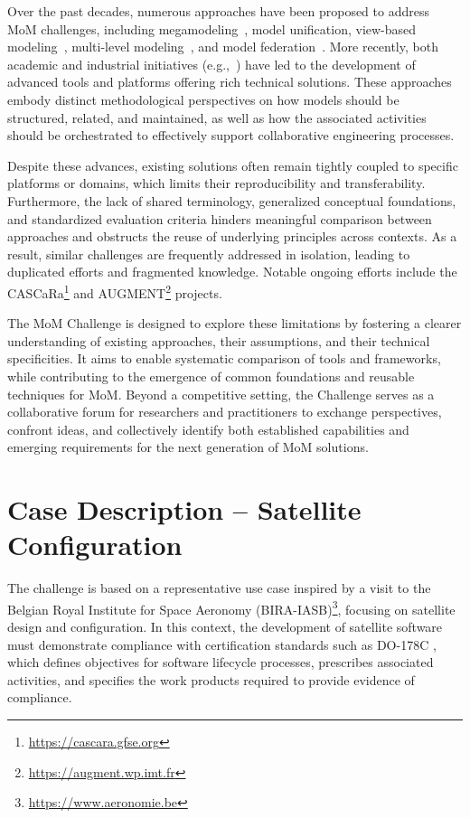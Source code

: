 \documentclass{article}
\begin{document}
Over the past decades, numerous approaches have been proposed to address MoM
challenges, including megamodeling~\cite{bezivin2004need}, model unification,
view-based modeling~\cite{osate-dim}, multi-level modeling~\cite{megamodel}, and
model federation~\cite{openflexo}. More recently, both academic and
industrial initiatives (e.g.,~\cite{renault-mom,magicgrid,openmbee,opencaesar,magicdraw})
have led to the development of advanced tools and platforms offering rich
technical solutions. These approaches embody distinct methodological perspectives
on how models should be structured, related, and maintained, as well as how the
associated activities should be orchestrated to effectively support collaborative
engineering processes.

Despite these advances, existing solutions often remain tightly coupled to
specific platforms or domains, which limits their reproducibility and
transferability. Furthermore, the lack of shared terminology, generalized conceptual
foundations, and standardized evaluation criteria hinders meaningful comparison
between approaches and obstructs the reuse of underlying principles across
contexts. As a result, similar challenges are frequently addressed in isolation,
leading to duplicated efforts and fragmented knowledge. Notable ongoing efforts include the CASCaRa\footnote{\url{https://cascara.gfse.org}} and AUGMENT\footnote{\url{https://augment.wp.imt.fr}} projects. 

The MoM Challenge is designed to explore these limitations by fostering a clearer
understanding of existing approaches, their assumptions, and their technical
specificities. It aims to enable systematic comparison of tools and frameworks,
while contributing to the emergence of common foundations and reusable techniques
for MoM. Beyond a competitive setting, the Challenge serves as a
collaborative forum for researchers and practitioners to exchange perspectives,
confront ideas, and collectively identify both established capabilities and
emerging requirements for the next generation of MoM solutions.


\section{Case Description -- Satellite Configuration}
\label{sec:CD}

The challenge is based on a representative use case inspired by a visit to
the Belgian Royal Institute for Space Aeronomy 
(BIRA-IASB)\footnote{\url{https://www.aeronomie.be}}, focusing on satellite design and configuration. 
In this context, the development of satellite software must demonstrate compliance 
with certification standards such as DO-178C \cite{do-178C}, which defines objectives for software 
lifecycle processes, prescribes associated activities, and specifies the work 
products required to provide evidence of compliance.
\end{document}
